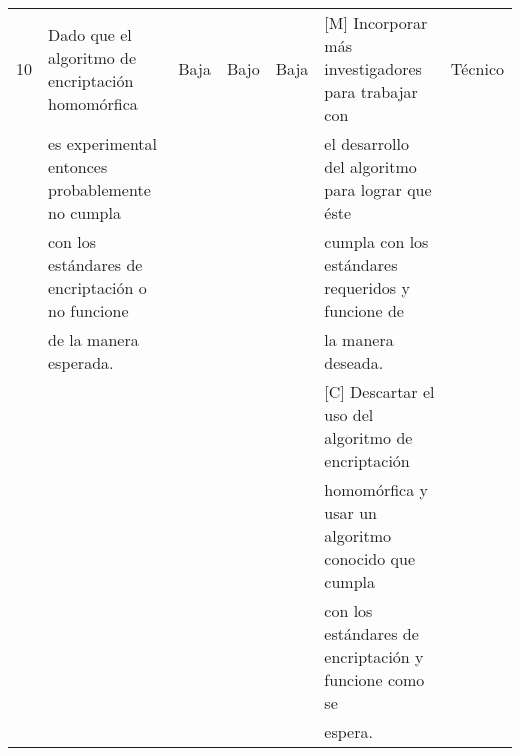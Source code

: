 \begin{landscape}
\begin{table}
\begin{tabular}{| l | l | l | l | l | l | l | }
10 & Dado que el algoritmo de encriptación homomórfica & Baja & Bajo & Baja & [M] Incorporar más investigadores para trabajar con & Técnico\\
  & es experimental entonces probablemente no cumpla  & & & &		el desarrollo del algoritmo para lograr que éste & \\
  & con los estándares de encriptación o no funcione  & & & &		cumpla con los estándares requeridos y funcione de & \\
  & de la manera esperada. 							  & & & & 		la manera deseada. & \\ 
  &&&&																&[C] Descartar el uso del algoritmo de encriptación & \\ 		  &&&&																& homomórfica y usar un algoritmo conocido que cumpla & \\
  &&&&																& con los estándares de encriptación y funcione como se & \\
  &&&&																& espera. &\\ \hline

     \hline
\end{tabular}
\end{table}
\end{landscape}